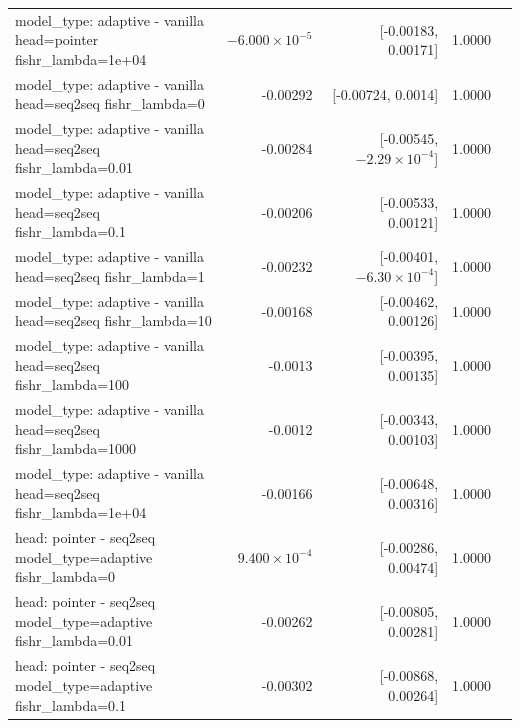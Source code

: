 \documentclass[10pt]{article}
\makeatletter
\newcommand{\stackcell}[1]{\begin{tabular}[t]{@{}l@{}}#1\end{tabular}}
\makeatother
\begin{document}
{\begin{longtable}{lrrrl}
\stackcell{model\_type: adaptive - vanilla\\\footnotesize head=pointer fishr\_lambda=1e+04 } & $-6.000\times10^{-5}$ & [-0.00183, 0.00171] & 1.0000 & \\
\stackcell{model\_type: adaptive - vanilla\\\footnotesize head=seq2seq fishr\_lambda=0 } & -0.00292 & [-0.00724, 0.0014] & 1.0000 & \\
\stackcell{model\_type: adaptive - vanilla\\\footnotesize head=seq2seq fishr\_lambda=0.01 } & -0.00284 & [-0.00545, $-2.29\times10^{-4}$] & 1.0000 & \\
\stackcell{model\_type: adaptive - vanilla\\\footnotesize head=seq2seq fishr\_lambda=0.1 } & -0.00206 & [-0.00533, 0.00121] & 1.0000 & \\
\stackcell{model\_type: adaptive - vanilla\\\footnotesize head=seq2seq fishr\_lambda=1 } & -0.00232 & [-0.00401, $-6.30\times10^{-4}$] & 1.0000 & \\
\stackcell{model\_type: adaptive - vanilla\\\footnotesize head=seq2seq fishr\_lambda=10 } & -0.00168 & [-0.00462, 0.00126] & 1.0000 & \\
\stackcell{model\_type: adaptive - vanilla\\\footnotesize head=seq2seq fishr\_lambda=100 } & -0.0013 & [-0.00395, 0.00135] & 1.0000 & \\
\stackcell{model\_type: adaptive - vanilla\\\footnotesize head=seq2seq fishr\_lambda=1000 } & -0.0012 & [-0.00343, 0.00103] & 1.0000 & \\
\stackcell{model\_type: adaptive - vanilla\\\footnotesize head=seq2seq fishr\_lambda=1e+04 } & -0.00166 & [-0.00648, 0.00316] & 1.0000 & \\
\stackcell{head: pointer - seq2seq\\\footnotesize model\_type=adaptive fishr\_lambda=0 } & $9.400\times10^{-4}$ & [-0.00286, 0.00474] & 1.0000 & \\
\stackcell{head: pointer - seq2seq\\\footnotesize model\_type=adaptive fishr\_lambda=0.01 } & -0.00262 & [-0.00805, 0.00281] & 1.0000 & \\
\stackcell{head: pointer - seq2seq\\\footnotesize model\_type=adaptive fishr\_lambda=0.1 } & -0.00302 & [-0.00868, 0.00264] & 1.0000 & \\

\end{longtable}}
\end{document}
